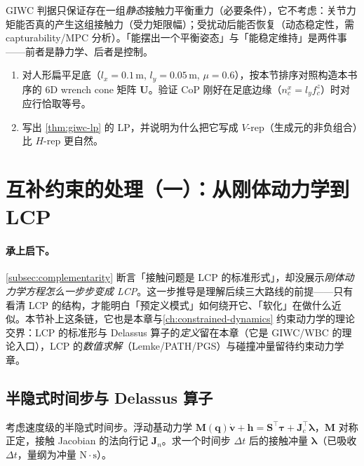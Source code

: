 \begin{pitfall}
GIWC 判据只保证存在一组\emph{静态}接触力平衡重力（必要条件），它不考虑：关节力矩能否真的产生这组接触力（受力矩限幅）；受扰动后能否恢复（动态稳定性，需 capturability/MPC 分析）。「能摆出一个平衡姿态」与「能稳定维持」是两件事——前者是静力学、后者是控制。
\end{pitfall}

\begin{practice}
\begin{enumerate}
  \item 对人形扁平足底（$l_x=0.1\,$m, $l_y=0.05\,$m, $\mu=0.6$），按本节排序对照构造本书序的 6D wrench cone 矩阵 $\mathbf{U}$。验证 CoP 刚好在足底边缘（$n_c^x=l_y f_c^z$）时对应行恰取等号。
  \item 写出 \cref{thm:giwc-lp} 的 LP，并说明为什么把它写成 $V$-rep（生成元的非负组合）比 $H$-rep 更自然。
\end{enumerate}
\end{practice}

\section{互补约束的处理（一）：从刚体动力学到 LCP}
\label{sec:contact-complementarity-lcp}

\paragraph{承上启下。}
\cref{subsec:complementarity} 断言「接触问题是 LCP 的标准形式」，却没展示\emph{刚体动力学方程怎么一步步变成 LCP}。这一步推导是理解后续三大路线的前提——只有看清 LCP 的结构，才能明白「预定义模式」如何绕开它、「软化」在做什么近似。本节补上这条链，它也是本章与\cref{ch:constrained-dynamics} 约束动力学的理论交界：LCP 的标准形与 Delassus 算子的\emph{定义}留在本章（它是 GIWC/WBC 的理论入口），LCP 的\emph{数值求解}（Lemke/PATH/PGS）与碰撞冲量留待约束动力学章。

\subsection{半隐式时间步与 Delassus 算子}
\label{subsec:lcp-derivation}

考虑速度级的半隐式时间步。浮动基动力学 $\mathbf{M}(\boldsymbol{q})\dot{\boldsymbol{v}}+\boldsymbol{h}=\mathbf{S}^\top\boldsymbol{\tau}+\mathbf{J}_c^\top\boldsymbol{\lambda}$，$\mathbf{M}$ 对称正定，接触 Jacobian 的法向行记 $\mathbf{J}_n$。求一个时间步 $\Delta t$ 后的接触冲量 $\boldsymbol{\lambda}$（已吸收 $\Delta t$，量纲为冲量 $\mathrm{N\cdot s}$）。

